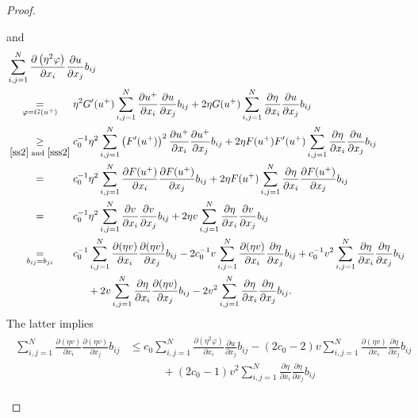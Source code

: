 \documentclass[11pt, a4paper]{article}
\numberwithin{equation}{section}
\newcommand{\coex}[2][\hphantom{longexplanation}]{%
  \underset{{#1}}{\overset{\hphantom{longexplanation}}{#2}}
}
\begin{document}
\begin{proof}
\begin{itemize}[wide]
and
\begin{align*}
  &\sum_{i,j=1}^{N}\frac{\partial \left(\eta^{2}\varphi \right)}{\partial
    x_{i}}\frac{\partial u}{\partial x_{j}}b_{ij}\\
  &\coex[\varphi=G \left(u^{+} \right)]{=}
    \eta^{2}G'(u^{+})\sum_{i,j=1}^{N}\frac{\partial u^{+}}{\partial
    x_{i}}\frac{\partial u}{\partial x_{j}}b_{ij}+ 2\eta
    G(u^{+})\sum_{i,j=1}^{N}\frac{\partial \eta}{\partial
    x_{i}}\frac{\partial u}{\partial x_{j}}b_{ij}\\
  &\coex[\eqref{ss2} \text{ and }\eqref{sss2}]{\ge}
    c_{0}^{-1}\eta^{2}\sum_{i,j=1}^{N} \left(F'(u^{+}) \right)^{2}\frac{\partial
    u^{+}}{\partial x_{i}}\frac{\partial u^{+}}{\partial x_{j}}b_{ij}+
    2\eta F(u^{+})F'(u^{+})\sum_{i,j=1}^{N}\frac{\partial
    \eta}{\partial x_{i}}\frac{\partial u}{\partial x_{j}}b_{ij}\\
  &\coex{=} c_{0}^{-1}\eta^{2}\sum_{i,j=1}^{N}\frac{\partial
    F(u^{+})}{\partial x_{i}}\frac{\partial F(u^{+})}{\partial
    x_{j}}b_{ij}+ 2\eta F(u^{+})\sum_{i,j=1}^{N}\frac{\partial
    \eta}{\partial x_{i}}\frac{\partial F(u^{+})}{\partial
    x_{j}}b_{ij} \\
  &\coex{=} c_{0}^{-1}\eta^{2}\sum_{i,j=1}^{N}\frac{\partial
    v}{\partial x_{i}}\frac{\partial v}{\partial x_{j}}b_{ij}+ 2\eta
    v\sum_{i,j=1}^{N}\frac{\partial \eta}{\partial
    x_{i}}\frac{\partial v}{\partial x_{j}}b_{ij} \\
  &\coex[b_{ij}=b_{ji}]{=}
    c_{0}^{-1}
\sum_{i,j=1}^{N}\frac{\partial (\eta v)}{\partial x_{i}}\frac{\partial(\eta v)}{\partial x_{j}}b_{ij}-2c_{0}^{-1} v\sum_{i,j=1}^{N}\frac{\partial  (\eta v)}{\partial x_{i}}\frac{\partial\eta }{\partial x_{j}}b_{ij} + c_{0}^{-1}
v^{2}\sum_{i,j=1}^{N}\frac{\partial  \eta}{\partial
    x_{i}}\frac{\partial\eta }{\partial x_{j}}b_{ij}\\
  &\coex{~} \qquad
    + 2v\sum_{i,j=1}^{N}\frac{\partial \eta}{\partial x_{i}}\frac{\partial (\eta v)}{\partial x_{j}}b_{ij} - 2v^{2}\sum_{i,j=1}^{N}\frac{\partial \eta}{\partial x_{i}}\frac{\partial \eta }{\partial x_{j}}b_{ij}.
\end{align*}
The latter implies
\begin{align}
  \begin{split}
    \sum_{i,j=1}^{N}\frac{\partial (\eta v)}{\partial
  x_{i}}\frac{\partial(\eta v)}{\partial x_{j}}b_{ij}
&\le
c_{0}\sum_{i,j=1}^{N}\frac{\partial (\eta^{2}\varphi)}{\partial
  x_{i}}\frac{\partial u}{\partial x_{j}}b_{ij} -(2c_{0}-2)
v\sum_{i,j=1}^{N}\frac{\partial  (\eta v)}{\partial
  x_{i}}\frac{\partial\eta }{\partial x_{j}}b_{ij}\\
&\qquad \quad+ (2c_{0}-1)v^{2}\sum_{i,j=1}^{N}\frac{\partial  \eta}{\partial x_{i}}\frac{\partial\eta }{\partial x_{j}}b_{ij}
  \end{split}
\label{pa1b}
\end{align}


\end{itemize}
\end{proof}
\end{document}
